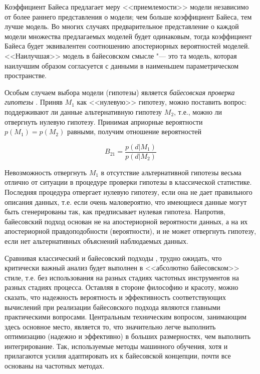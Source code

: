 Коэффициент Байеса предлагает меру <<приемлемости>> модели независимо от более раннего представления о модели; 
чем больше коэффициент Байеса, тем лучше модель. Во многих случаях предварительное представление о каждой модели 
множества предлагаемых моделей будет одинаковым, тогда коэффициент Байеса будет эквивалентен соотношению апостериорных 
вероятностей моделей. <<Наилучшая>> модель в байесовском смысле "--- это та модель, которая наилучшим образом 
согласуется с данными в наименьшем параметрическом пространстве.

Особым случаем выбора модели (гипотезы) является \textit{байесовская проверка гипотезы} 
\cite{ivezic2019statistics, rouder2009bayesian}. Приняв $M_1$ как <<нулевую>> гипотезу, можно поставить вопрос: 
поддерживают ли данные альтернативную гипотезу $M_2$, т.е., можно ли отвергнуть нулевую гипотезу. Принимая априорные 
вероятности $p(M_1) = p(M_2)$ равными, получим отношение вероятностей

\begin{equation}
B_{21} = \frac{p(d|M_1)}{p(d|M_2)}  
\end{equation}

Невозможность отвергнуть $M_1$ в отсутствие альтернативной гипотезы весьма отлично от ситуации в процедуре проверки 
гипотезы в классической статистике. Последняя процедура отвергает нулевую гипотезу, если она не дает правильного 
описания данных, т.е. если очень маловероятно, что имеющиеся данные могут быть сгенерированы так, как предписывает 
нулевая гипотеза. Напротив, байесовский подход основан не на апостериорной вероятности данных, а на их апостериорной 
правдоподобности (вероятности), и не может отвергнуть гипотезу, если нет альтернативных объяснений наблюдаемых данных.

Сравнивая классический и байесовский подходы \cite{ivezic2019statistics}, трудно ожидать, что критически важный анализ 
будет выполнен в <<абсолютно байесовском>> стиле, т.е. без использования на разных стадиях частотных инструментов на 
разных стадиях процесса. Оставляя в стороне философию и красоту, можно сказать, что надежность вероятность и 
эффективность соответствующих вычислений при реализации байесовского подхода являются главными практическими вопросами. 
Центральным техническим вопросом, занимающим здесь основное место, является то, что значительно легче выполнить 
оптимизацию (надежно и эффективно) в больших размерностях, чем выполнить интегрирование. Так, используемые методы 
машинного обучения, хотя и прилагаются усилия адаптировать их к байесовской концепции, почти все основаны на 
частотных методах. 

